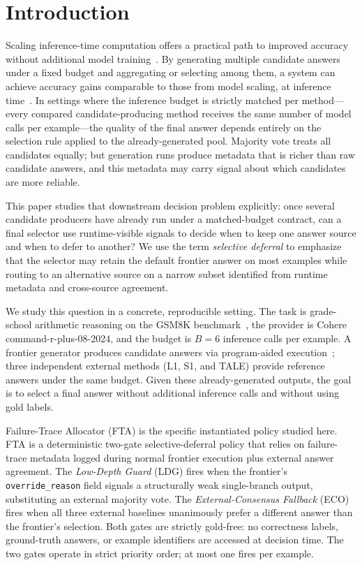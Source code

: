 \section{Introduction}
\label{sec:introduction}

Scaling inference-time computation offers a practical path to improved accuracy
without additional model training~\citep{snell2024scaling}.
By generating multiple candidate answers under a fixed budget and aggregating or
selecting among them, a system can achieve accuracy gains comparable to those from
model scaling, at inference time~\citep{wang2023self}.
In settings where the inference budget is strictly matched per method---every compared
candidate-producing method receives the same number of model calls per example---the
quality of the final answer depends entirely on the selection rule applied to the
already-generated pool.
Majority vote treats all candidates equally; but generation runs produce metadata
that is richer than raw candidate answers, and this metadata may carry signal about
which candidates are more reliable.

This paper studies that downstream decision problem explicitly: once several
candidate producers have already run under a matched-budget contract, can a final
selector use runtime-visible signals to decide when to keep one answer source and
when to defer to another? We use the term \emph{selective deferral} to emphasize
that the selector may retain the default frontier answer on most examples while
routing to an alternative source on a narrow subset identified from runtime
metadata and cross-source agreement.

We study this question in a concrete, reproducible setting.
The task is grade-school arithmetic reasoning on the GSM8K
benchmark~\citep{cobbe2021training}, the provider is Cohere command-r-plus-08-2024,
and the budget is $B = 6$ inference calls per example.
A frontier generator produces candidate answers via program-aided
execution~\citep{gao2023pal}; three independent external methods (L1, S1, and TALE)
provide reference answers under the same budget.
Given these already-generated outputs, the goal is to select a final answer without
additional inference calls and without using gold labels.

Failure-Trace Allocator (FTA) is the specific instantiated policy studied here.
FTA is a deterministic two-gate selective-deferral policy that relies on
failure-trace metadata logged during normal frontier execution plus external answer
agreement.
The \textit{Low-Depth Guard} (LDG) fires when the frontier's
\texttt{override\_reason} field signals a structurally weak single-branch output,
substituting an external majority vote.
The \textit{External-Consensus Fallback} (ECO) fires when all three external
baselines unanimously prefer a different answer than the frontier's selection.
Both gates are strictly gold-free: no correctness labels, ground-truth answers, or
example identifiers are accessed at decision time.
The two gates operate in strict priority order; at most one fires per example.

